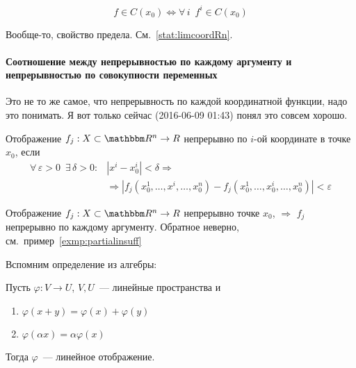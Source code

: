 \documentclass[12pt]{../../notes}
\begin{document}
\begin{thrm}\label{thrm:coordfcontRn}
  \[
    f \in C(x_0) \Leftrightarrow \forall\, i \;\: f^i \in C(x_0)
  \]
\end{thrm}
\begin{ittproof}
  Вообще-то, свойство предела. См.~\ref{stat:limcoordRn}.
\end{ittproof}

\paragraph{Соотношение между непрерывностью по каждому аргументу и непрерывностью по совокупности переменных}

Это не то же самое, что непрерывность по каждой координатной функции, надо это понимать. Я вот только
сейчас (2016-06-09 01:43) понял это совсем хорошо.

\begin{defn}\label{defn:contargRn}
  Отображение $f_j: X\subset\R^n \to R$ непрерывно по $i$-ой координате в точке $x_0$, если 
  \[
    \begin{split}
      \forall\, \varepsilon > 0 \;\: \exists\, \delta > 0 \colon &| x^i - x^i_0 | < \delta \Rightarrow \\ 
      &\Rightarrow | f_j(x_0^1, \dotsc, x^i, \dotsc, x^n_0) - f_j(x_0^1, \dotsc, x^i_0, \dotsc, x^n_0)  | <\varepsilon
    \end{split}
  \]
\end{defn}

\begin{lem}\label{lem:contfandcontargRn}
  Отображение $f_j: X\subset\R^n \to R$ непрерывно точке $x_0$, $\Rightarrow$ $f_j$ непрерывно по каждому аргументу.
  Обратное неверно, см.~пример~\ref{exmp:partialinsuff}
\end{lem}




Вспомним определение из алгебры:
\begin{defn}\label{defn:linfun}
  Пусть $\varphi:V \to U$, $V,U$~--- линейные пространства и
  \begin{enumerate}
    \item $\varphi(x+y) = \varphi(x) + \varphi(y)$
    \item $\varphi(\alpha x) = \alpha \varphi(x)$
  \end{enumerate}
  Тогда $\varphi$~--- линейное отображение.
\end{defn}
\end{document}
